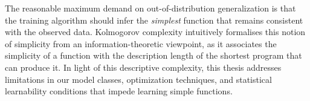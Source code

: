 %
%

\noindent
The reasonable maximum demand on out-of-distribution generalization is that the training algorithm should infer the \textit{simplest} function that remains consistent with the observed data.
Kolmogorov complexity intuitively formalises this notion of simplicity from an information-theoretic viewpoint, as it associates the simplicity of a function with the description length of the shortest program that can produce it.
In light of this descriptive complexity, this thesis addresses limitations in our model classes, optimization techniques, and statistical learnability conditions that impede learning simple functions.

